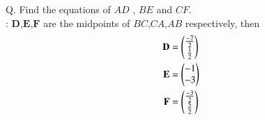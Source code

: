 \documentclass[journal,12pt,onecolumn]{IEEEtran}
\theoremstyle{remark}
\begin{document}
\let\vec\mathbf




\vspace{3cm}



\bigskip

\renewcommand{\thefigure}{\theenumi}
\renewcommand{\thetable}{\theenumi}


Q. Find the equations of $AD$ , $BE$ and $CF$.
\\ \solution:
$\vec{D}$,$\vec{E}$,$\vec{F}$ are the midpoints of $BC$,$CA$,$AB$ respectively, then\\
\begin{align}
 \vec{D} &=  \myvec{\frac{-7}{2}\\\frac{1}{2}}\\
 \vec{E} &=  \myvec{-1\\-3}\\
 \vec{F} &= \myvec{\frac{-3}{2}\\\frac{5}{2}}
\end{align}
\end{document}

